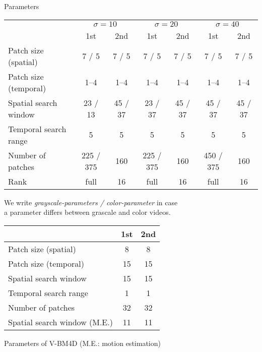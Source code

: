 \documentclass[mathserif, 8pt]{beamer}
\begin{document}
\begin{frame}{Parameters}
	\begin{center}

	\begin{tabular}{l | c c | c c | c c }
		& \multicolumn{2}{c|}{$\sigma = 10$} 
		& \multicolumn{2}{c|}{$\sigma = 20$} 
		& \multicolumn{2}{c}{$\sigma = 40$} \\
		                            & 1st    & 2nd   & 1st   & 2nd   & 1st   & 2nd \\\hline\hline
		Patch size (spatial)        &  7 / 5 & 7 / 5 & 7 / 5 & 7 / 5 & 7 / 5 & 7 / 5 \\
		Patch size (temporal)       &  1--4  & 1--4  & 1--4  & 1--4  & 1--4  & 1--4  \\
		Spatial search window       & 23 / 13&45 / 37&23 / 37&45 / 37&45 / 37& 45 / 37\\
		Temporal search range       & 5    & 5    & 5    & 5    & 5    & 5   \\
		Number of patches           & 225 / 375  & 160  & 225 / 375 & 160  & 450 / 375 & 160 \\
		Rank                        & full & 16   & full & 16   & full & 16  \\
	\end{tabular}

	\bigskip

	We write \emph{grayscale-parameters / color-parameter} in case\\ a parameter
	differs between grascale and color videos.

	\pause
	\bigskip

	\begin{tabular}{l | c c}
		                              & 1st & 2nd  \\\hline\hline
		Patch size (spatial)          &  8  &   8  \\
		Patch size (temporal)         & 15  &  15  \\
		Spatial search window         & 15  &  15  \\
		Temporal search range         &  1  &   1  \\
		Number of patches             & 32  &  32  \\
		Spatial search window (M.E.)  & 11  &  11  \\
	\end{tabular}

	\vspace{.1cm}
	Parameters of V-BM4D (M.E.: motion estimation)

	\end{center}
\end{frame}
\end{document}
